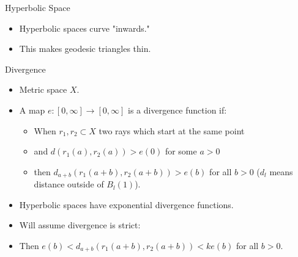 \documentclass{beamer}
\begin{document}
\begin{frame}{Hyperbolic Space}

  \begin{itemize}
  	\item Hyperbolic spaces curve "inwards."
	\item This makes geodesic triangles thin.



  \end{itemize}

\end{frame}

\begin{frame}{Divergence}
	\begin{itemize}
		\item Metric space $X$.
		\item A map $e : [0, \infty] \to [0, \infty]$ is a divergence function if:
		\begin{itemize}
			\item When $r_1, r_2 \subset X$ two rays which start at the same point
			\item and $d(r_1(a), r_2(a)) > e(0)$ for some $a>0$
			\item then $d_{a+b}(r_1(a+b), r_2(a+b)) > e(b)$ for all $b>0$ ($d_l$ means distance outside of $B_l(1)$).
		\end{itemize}
		\pause
		\item Hyperbolic spaces have exponential divergence functions.
		\pause
		\item Will assume divergence is strict:
		\item Then $e(b) < d_{a+b}(r_1(a+b), r_2(a+b)) < ke(b)$ for all $b > 0$.
	\end{itemize}
\end{frame}
\end{document}
